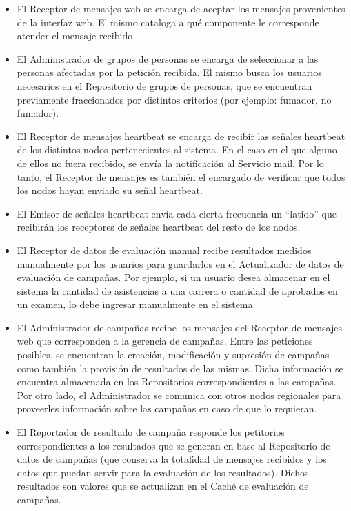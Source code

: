 \documentclass[a4paper, 10pt, twoside]{article}
\begin{document}
\begin{itemize}
\item El Receptor de mensajes web se encarga de aceptar los mensajes provenientes de la interfaz web. El mismo cataloga a qué componente le corresponde atender el mensaje recibido.
\item El Administrador de grupos de personas se encarga de seleccionar a las personas afectadas por la petición recibida. El mismo busca los usuarios necesarios en el Repositorio de grupos de personas, que se encuentran previamente fraccionados por distintos criterios (por ejemplo: fumador, no fumador).
\item El Receptor de mensajes heartbeat se encarga de recibir las señales heartbeat de los distintos nodos pertenecientes al sistema. En el caso en el que alguno de ellos no fuera recibido, se envía la notificación al Servicio mail. Por lo tanto, el Receptor de mensajes es también el encargado de verificar que todos los nodos hayan enviado su señal heartbeat.
\item El Emisor de señales heartbeat envía cada cierta frecuencia un ``latido'' que recibirán los receptores de señales heartbeat del resto de los nodos.
\item El Receptor de datos de evaluación manual recibe resultados medidos manualmente por los usuarios para guardarlos en el Actualizador de datos de evaluación de campañas. Por ejemplo, si un usuario desea almacenar en el sistema la cantidad de asistencias a una carrera o cantidad de aprobados en un examen, lo debe ingresar manualmente en el sistema.
\item El Administrador de campañas recibe los mensajes del Receptor de mensajes web que corresponden a la gerencia de campañas. Entre las peticiones posibles, se encuentran la creación, modificación y supresión de campañas como también la provisión de resultados de las mismas. Dicha información se encuentra almacenada en los Repositorios correspondientes a las campañas. Por otro lado, el Administrador se comunica con otros nodos regionales para proveerles información sobre las campañas en caso de que lo requieran.
\item El Reportador de resultado de campaña responde los petitorios correspondientes a los resultados que se generan en base al Repositorio de datos de campañas (que conserva la totalidad de mensajes recibidos y los datos que puedan servir para la evaluación de los resultados). Dichos resultados son valores que se actualizan en el Caché de evaluación de campañas.
\end{itemize}
\end{document}
